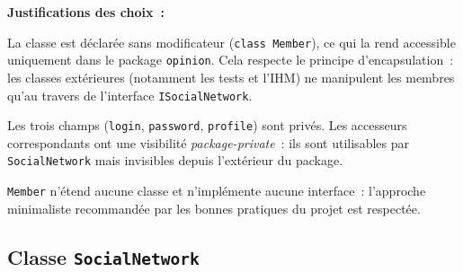 \documentclass[12pt,a4paper]{article}
\begin{document}
\textbf{Justifications des choix~:}

\begin{description}[leftmargin=2cm, labelwidth=1.8cm]
  \item[Visibilité \emph{package}] La classe est déclarée sans modificateur
        (\texttt{class Member}), ce qui la rend accessible uniquement dans le package
        \texttt{opinion}.  Cela respecte le principe d'encapsulation~: les classes extérieures
        (notamment les tests et l'IHM) ne manipulent les membres qu'au travers de l'interface
        \texttt{ISocialNetwork}.

  \item[Attributs \texttt{private}] Les trois champs (\texttt{login}, \texttt{password},
        \texttt{profile}) sont privés.  Les accesseurs correspondants ont une visibilité
        \emph{package-private}~: ils sont utilisables par \texttt{SocialNetwork} mais
        invisibles depuis l'extérieur du package.

  \item[Pas d'héritage] \texttt{Member} n'étend aucune classe et n'implémente aucune
        interface~: l'approche minimaliste recommandée par les bonnes pratiques du projet est
        respectée. \\[2cm]
\end{description}

\subsection{Classe \texttt{SocialNetwork}}
\end{document}
